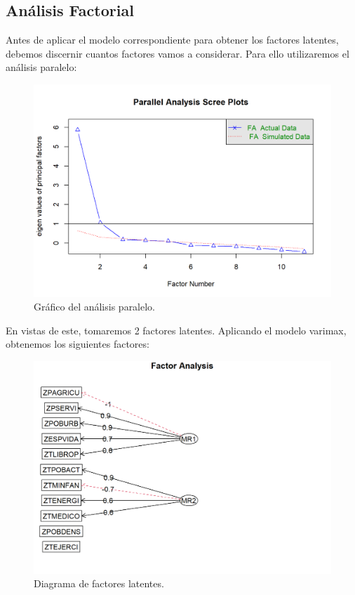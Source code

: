 \subsection{Análisis Factorial}
Antes de aplicar el modelo correspondiente para obtener los factores latentes, debemos discernir cuantos factores vamos a considerar. Para ello utilizaremos el análisis paralelo:
\begin{figure}[H]
    \centering
    \includegraphics[scale=0.6]{paralelo.png}
    \caption{Gráfico del análisis paralelo.}
\end{figure}
En vistas de este, tomaremos 2 factores latentes. Aplicando el modelo varimax, obtenemos los siguientes factores:
\begin{figure}[H]
    \centering
    \includegraphics[scale=0.6]{factores.png}
    \caption{Diagrama de factores latentes.}
\end{figure}

